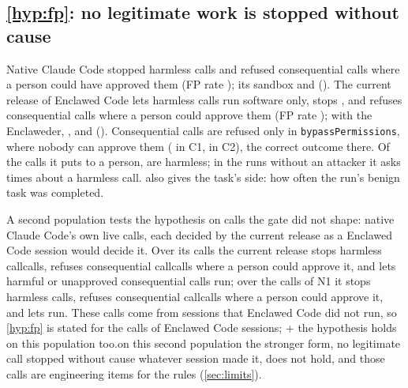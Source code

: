 \documentclass[11pt]{article}
\newcommand{\dev}{Enclaweder}
\newcommand{\cz}{Enclawed Code}
\begin{document}
\subsection{\ref{hyp:fp}: no legitimate work is stopped without cause}
\label{sec:res-h2}

Native Claude Code stopped \NativeFPHarmless{} harmless calls and refused
\NativeFPConsequential{} consequential calls where a person could have
approved them (FP rate \NativeFPRate{}); its sandbox \SandboxFPHarmless{}
and \SandboxFPConsequential{} (\SandboxFPRate{}). The current release of
\cz{} lets \OutCzOneHarmlessRan{} harmless calls run software only, stops
\CzOneFPHarmless{}, and refuses \CzOneFPConsequential{} consequential
calls where a person could approve them (FP rate \CzOneFPRate{}); with
the \dev{}, \OutCzTwoHarmlessRan{}, \CzTwoFPHarmless{} and
\CzTwoFPConsequential{} (\CzTwoFPRate{}). Consequential calls are refused
only in \texttt{bypassPermissions}, where nobody can approve them
(\OutCzOneConsequentialRefusedNoPerson{} in C1,
\OutCzTwoConsequentialRefusedNoPerson{} in C2), the correct outcome
there. Of the \CzAsked{} calls it puts to a person, \CzAskedHarmless{}
are harmless; in the runs without an attacker it asks
\CzNoAttackerAskHarmless{} times about a harmless call. 
also gives the task's side: how often the run's benign task was
completed.

A second population tests the hypothesis on calls the gate did not
shape: native Claude Code's own live calls, each decided by the current
release as a \cz{} session would decide it. Over its
\ReplayNativeCalls{} calls the current release stops
\ReplayNativeFPHarmless{} harmless
\ifnum{} call\else calls\fi{}, refuses
\ReplayNativeFPConsequential{} consequential
\ifnum{} call\else calls\fi{} where a person
could approve it, and lets \ReplayNativeFN{} harmful or unapproved
consequential calls run; over the \ReplaySandboxCalls{} calls of N1 it
stops \ReplaySandboxFPHarmless{} harmless calls, refuses
\ReplaySandboxFPConsequential{} consequential
\ifnum{} call\else calls\fi{} where a
person could approve it, and lets \ReplaySandboxFN{} run. These calls
come from sessions that \cz{} did not run, so \ref{hyp:fp} is stated for
the calls of \cz{} sessions;
\ifnum\numexpr\ReplayNativeFP+\ReplaySandboxFP{} the hypothesis
holds on this population too.\else on this second population the
stronger form, no legitimate call stopped without cause whatever
session made it, does not hold, and those calls are engineering items
for the rules (\cref{sec:limits}).\fi
\end{document}
